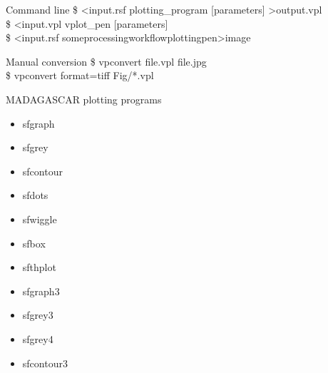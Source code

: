 \begin{frame}
  \begin{block}{Command line}
    \$ \textless input.rsf plotting\_program [parameters] \textgreater output.vpl \\
    \$ \textless input.vpl vplot\_pen [parameters] \\
    \$ \textless input.rsf some\textbar processing\textbar workflow\textbar plotting\textbar pen\textgreater image
  \end{block}

  \begin{block}{Manual conversion}
    \$ vpconvert file.vpl file.jpg \\
    \$ vpconvert format=tiff Fig/*.vpl
  \end{block}


  \begin{block}{MADAGASCAR plotting programs}
    \begin{minipage}{0.4\textwidth}
    \begin{itemize}
      \item sfgraph
      \item sfgrey
      \item sfcontour
      \item sfdots
      \item sfwiggle
      \item sfbox
    \end{itemize}
    \end{minipage}
    \begin{minipage}{0.4\textwidth}
    \begin{itemize}
       \item sfthplot
       \item sfgraph3
      \item sfgrey3
      \item sfgrey4
      \item sfcontour3
    \end{itemize}
    \end{minipage}
  \end{block}
\end{frame}

